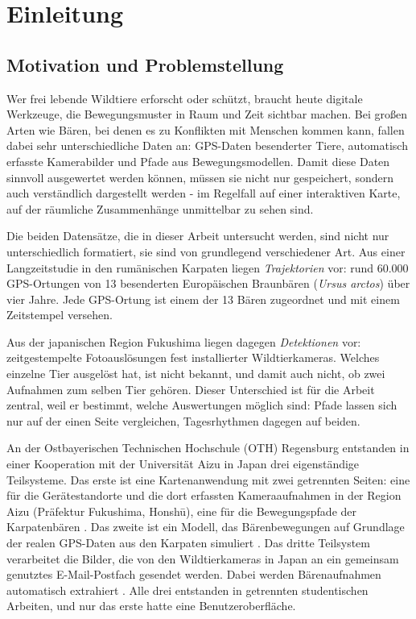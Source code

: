 \documentclass[12pt,a4paper]{report}
\begin{document}
{}
\listoftables
\clearpage


\chapter{Einleitung}
\label{chap:einleitung}

\section{Motivation und Problemstellung}
\label{sec:motivation}

Wer frei lebende Wildtiere erforscht oder schützt, braucht heute digitale Werkzeuge, die
Bewegungsmuster in Raum und Zeit sichtbar machen. Bei großen Arten wie Bären, bei denen es
zu Konflikten mit Menschen kommen kann, fallen dabei sehr unterschiedliche Daten an:
GPS-Daten besenderter Tiere, automatisch erfasste Kamerabilder und Pfade aus
Bewegungsmodellen. Damit diese Daten sinnvoll ausgewertet werden können, müssen sie nicht nur gespeichert, sondern auch verständlich dargestellt werden - im Regelfall auf einer
interaktiven Karte, auf der räumliche Zusammenhänge unmittelbar zu sehen sind.

Die beiden Datensätze, die in dieser Arbeit untersucht werden, sind nicht nur unterschiedlich formatiert, sie sind von
grundlegend verschiedener Art. Aus einer Langzeitstudie in den rumänischen Karpaten liegen
\emph{Trajektorien} vor: rund 60.000 GPS-Ortungen von 13 besenderten Europäischen
Braunbären (\emph{Ursus arctos}) über vier Jahre. 
Jede GPS-Ortung ist einem der 13 Bären
zugeordnet und mit einem Zeitstempel versehen.


Aus der japanischen Region Fukushima liegen dagegen \emph{Detektionen} vor: zeitgestempelte
Fotoauslösungen fest installierter Wildtierkameras. Welches einzelne Tier ausgelöst hat, ist
nicht bekannt, und damit auch nicht, ob zwei Aufnahmen zum selben Tier gehören. Dieser
Unterschied ist für die Arbeit zentral, weil er bestimmt, welche Auswertungen möglich sind:
Pfade lassen sich nur auf der einen Seite vergleichen, Tagesrhythmen dagegen auf beiden.

An der Ostbayerischen Technischen Hochschule (OTH) Regensburg entstanden in einer
Kooperation mit der Universität Aizu in Japan drei eigenständige Teilsysteme. Das erste ist
eine Kartenanwendung mit zwei getrennten Seiten: eine für die Gerätestandorte und die dort
erfassten Kameraaufnahmen in der Region Aizu (Präfektur Fukushima, Honshū), eine für die
Bewegungspfade der Karpatenbären \cite{LorenzBA}. Das zweite ist ein Modell, das
Bärenbewegungen auf Grundlage der realen GPS-Daten aus den Karpaten simuliert
\cite{BreuBA}. 
Das dritte Teilsystem verarbeitet die Bilder, die von den Wildtierkameras in Japan an ein gemeinsam genutztes E-Mail-Postfach gesendet werden. Dabei werden
Bärenaufnahmen automatisch extrahiert \cite{LelchatBA}. Alle drei entstanden in getrennten studentischen Arbeiten,
und nur das erste hatte eine Benutzeroberfläche.
\end{document}
